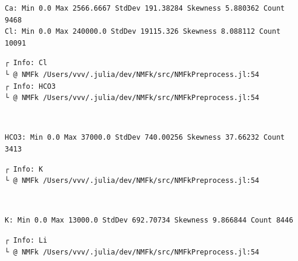 \documentclass[11pt]{article}
\begin{document}
    \begin{Verbatim}[commandchars=\\\{\}]
Ca: Min 0.0 Max 2566.6667 StdDev 191.38284 Skewness 5.880362 Count 9468
Cl: Min 0.0 Max 240000.0 StdDev 19115.326 Skewness 8.088112 Count 10091
    \end{Verbatim}

    \begin{Verbatim}[commandchars=\\\{\}]
┌ Info: Cl
└ @ NMFk /Users/vvv/.julia/dev/NMFk/src/NMFkPreprocess.jl:54
┌ Info: HCO3
└ @ NMFk /Users/vvv/.julia/dev/NMFk/src/NMFkPreprocess.jl:54
    \end{Verbatim}

    \begin{center}
    \end{center}
    { \hspace*{\fill} \\}

    \begin{Verbatim}[commandchars=\\\{\}]
HCO3: Min 0.0 Max 37000.0 StdDev 740.00256 Skewness 37.66232 Count 3413
    \end{Verbatim}

    \begin{Verbatim}[commandchars=\\\{\}]
┌ Info: K
└ @ NMFk /Users/vvv/.julia/dev/NMFk/src/NMFkPreprocess.jl:54
    \end{Verbatim}

    \begin{center}
    \end{center}
    { \hspace*{\fill} \\}

    \begin{Verbatim}[commandchars=\\\{\}]
K: Min 0.0 Max 13000.0 StdDev 692.70734 Skewness 9.866844 Count 8446
    \end{Verbatim}

    \begin{Verbatim}[commandchars=\\\{\}]
┌ Info: Li
└ @ NMFk /Users/vvv/.julia/dev/NMFk/src/NMFkPreprocess.jl:54
    \end{Verbatim}
\end{document}
